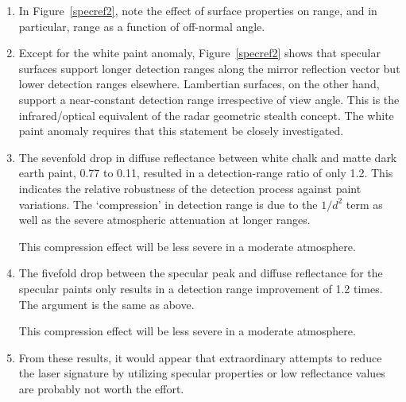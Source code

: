 \begin{enumerate}[1.]

\item
In Figure~\ref{specref2}, note the effect of surface properties on range, and in particular, range as a function of off-normal angle.
%
%

\item
Except for the white paint anomaly, Figure~\ref{specref2} shows that specular surfaces support longer detection ranges along the mirror reflection vector but lower detection ranges elsewhere. Lambertian surfaces, on the other hand, support a near-constant detection range irrespective of view angle. This is the infrared/optical equivalent of the radar geometric stealth concept. The white paint anomaly requires that this statement be closely investigated.

\item
The sevenfold drop in diffuse reflectance between white chalk and matte dark earth paint, 0.77 to 0.11, resulted in a detection-range ratio of only 1.2. This indicates the relative robustness of the detection process against paint variations. The `compression' in detection range is due to the $1/d^2$ term as well as the severe atmospheric attenuation at longer ranges.

This compression effect will be less severe in a moderate atmosphere.

\item
The fivefold drop between the specular peak and diffuse reflectance for the specular paints only results in a detection range improvement of 1.2 times. The argument is the same as  above.

This compression effect will be less severe in a moderate atmosphere.


\item 
From these results, it would appear that extraordinary attempts to reduce the laser signature by utilizing specular properties or low reflectance values are probably not worth the effort.



\end{enumerate}


